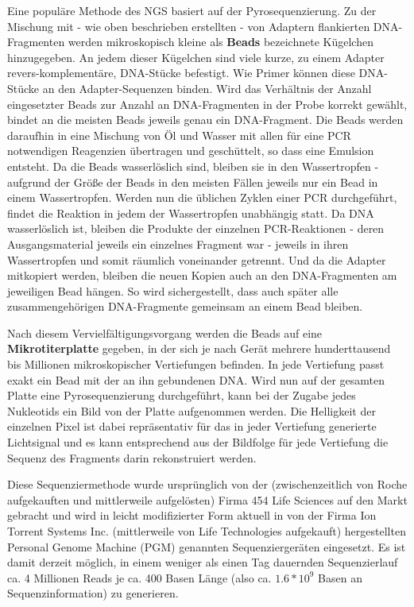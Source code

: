 Eine populäre Methode des NGS basiert auf der Pyrosequenzierung. Zu der Mischung mit - wie oben beschrieben erstellten - von Adaptern flankierten DNA-Fragmenten werden mikroskopisch kleine als \textbf{Beads} bezeichnete Kügelchen hinzugegeben. An jedem dieser Kügelchen sind viele kurze, zu einem Adapter revers-komplementäre, DNA-Stücke befestigt. Wie Primer können diese DNA-Stücke an den Adapter-Sequenzen binden. Wird das Verhältnis der Anzahl eingesetzter Beads zur Anzahl an DNA-Fragmenten in der Probe korrekt gewählt, bindet an die meisten Beads jeweils genau ein DNA-Fragment. Die Beads werden daraufhin in eine Mischung von Öl und Wasser mit allen für eine PCR notwendigen Reagenzien übertragen und geschüttelt, so dass eine Emulsion entsteht. Da die Beads wasserlöslich sind, bleiben sie in den Wassertropfen - aufgrund der Größe der Beads in den meisten Fällen jeweils nur ein Bead in einem Wassertropfen. Werden nun die üblichen Zyklen einer PCR durchgeführt, findet die Reaktion in jedem der Wassertropfen unabhängig statt. Da DNA wasserlöslich ist, bleiben die Produkte der einzelnen PCR-Reaktionen - deren Ausgangsmaterial jeweils ein einzelnes Fragment war - jeweils in ihren Wassertropfen und somit räumlich voneinander getrennt. Und da die Adapter mitkopiert werden, bleiben die neuen Kopien auch an den DNA-Fragmenten am jeweiligen Bead hängen. So wird sichergestellt, dass auch später alle zusammengehörigen DNA-Fragmente gemeinsam an einem Bead bleiben. 

Nach diesem Vervielfältigungsvorgang werden die Beads auf eine \textbf{Mikrotiterplatte} gegeben, in der sich je nach Gerät mehrere hunderttausend bis Millionen mikroskopischer Vertiefungen befinden. In jede Vertiefung passt exakt ein Bead mit der an ihn gebundenen DNA. Wird nun auf der gesamten Platte eine Pyrosequenzierung durchgeführt, kann bei der Zugabe jedes Nukleotids ein Bild von der Platte aufgenommen werden. Die Helligkeit der einzelnen Pixel ist dabei repräsentativ für das in jeder Vertiefung generierte Lichtsignal und es kann entsprechend aus der Bildfolge für jede Vertiefung die Sequenz des Fragments darin rekonstruiert werden.  

Diese Sequenziermethode wurde ursprünglich von der (zwischenzeitlich von Roche aufgekauften und mittlerweile aufgelösten) Firma 454 Life Sciences auf den Markt gebracht und wird in leicht modifizierter Form aktuell in von der Firma Ion Torrent Systems Inc. (mittlerweile von Life Technologies aufgekauft) hergestellten Personal Genome Machine (PGM) genannten Sequenziergeräten eingesetzt. Es ist damit derzeit möglich, in einem weniger als einen Tag dauernden Sequenzierlauf ca. 4 Millionen Reads je ca. 400 Basen Länge (also ca. $1.6*10^9$ Basen an Sequenzinformation) zu generieren. 


